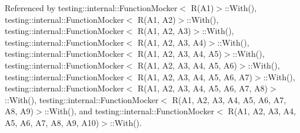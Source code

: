 Referenced by testing\+::internal\+::\+Function\+Mocker$<$ R(\+A1)$>$\+::\+With(), testing\+::internal\+::\+Function\+Mocker$<$ R(\+A1, A2)$>$\+::\+With(), testing\+::internal\+::\+Function\+Mocker$<$ R(\+A1, A2, A3)$>$\+::\+With(), testing\+::internal\+::\+Function\+Mocker$<$ R(\+A1, A2, A3, A4)$>$\+::\+With(), testing\+::internal\+::\+Function\+Mocker$<$ R(\+A1, A2, A3, A4, A5)$>$\+::\+With(), testing\+::internal\+::\+Function\+Mocker$<$ R(\+A1, A2, A3, A4, A5, A6)$>$\+::\+With(), testing\+::internal\+::\+Function\+Mocker$<$ R(\+A1, A2, A3, A4, A5, A6, A7)$>$\+::\+With(), testing\+::internal\+::\+Function\+Mocker$<$ R(\+A1, A2, A3, A4, A5, A6, A7, A8)$>$\+::\+With(), testing\+::internal\+::\+Function\+Mocker$<$ R(\+A1, A2, A3, A4, A5, A6, A7, A8, A9)$>$\+::\+With(), and testing\+::internal\+::\+Function\+Mocker$<$ R(\+A1, A2, A3, A4, A5, A6, A7, A8, A9, A10)$>$\+::\+With().


